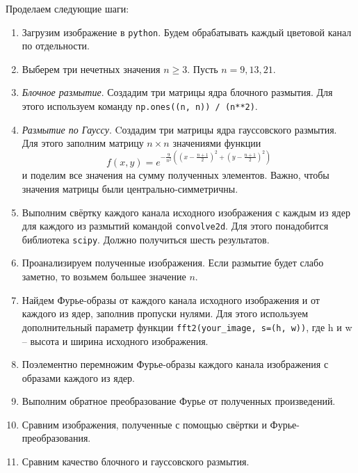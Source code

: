 \documentclass[a4paper, 12pt]{article}
\begin{document}
    
    Проделаем следующие шаги:
    \begin{enumerate}
        \item Загрузим изображение в \texttt{python}. Будем обрабатывать каждый цветовой канал по отдельности.
        \item Выберем три нечетных значения $n\geq3$. Пусть $n=9,13,21$.
        \item \textit{Блочное размытие}. Создадим три матрицы ядра блочного размытия. Для этого
        используем команду \texttt{np.ones((n, n)) / (n**2)}.
        \item \textit{Размытие по Гауссу}. Cоздадим три матрицы ядра гауссовского размытия. Для
        этого заполним матрицу $n \times n$ значениями функции
        $$
        f(x,y)=e^{-\frac{9}{n^2}\left(\left(x-\frac{n+1}{2}\right)^2+\left(y-\frac{n+1}{2}\right)^2\right)}
        $$
        и поделим все значения на сумму полученных элементов. Важно, чтобы значения матрицы были центрально-симметричны.
        \item Выполним свёртку каждого канала исходного изображения с каждым из ядер для каждого из
        размытий командой \texttt{convolve2d}. Для этого понадобится библиотека \texttt{scipy}. Должно получиться шесть результатов.
        \item Проанализируем полученные изображения. Если размытие будет слабо заметно, то возьмем большее значение $n$.
        \item Найдем Фурье-образы от каждого канала исходного изображения и от каждого из ядер, заполнив пропуски нулями. Для этого используем дополнительный параметр
        функции \texttt{fft2(your\_image, s=(h, w))}, где h и w -- высота и ширина исходного изображения.
        \item Поэлементно перемножим Фурье-образы каждого канала изображения с образами каждого из ядер.
        \item Выполним обратное преобразование Фурье от полученных произведений.
        \item Сравним изображения, полученные с помощью свёртки и Фурье-преобразования.
        \item Сравним качество блочного и гауссовского размытия.
    \end{enumerate}
\end{document}

